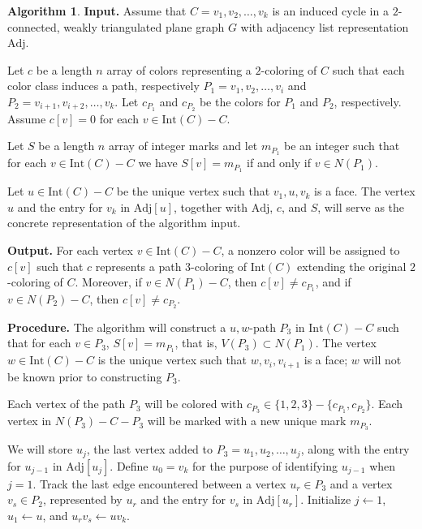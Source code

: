 \documentclass[12pt,letterpaper]{article}
\theoremstyle{plain}
\theoremstyle{definition}
\theoremstyle{break}
\newtheorem{algorithm}[lemma]{Algorithm}     %
\begin{document}
\begin{algorithm}\label{A:poh_linear}
\textbf{Input.} Assume that $C=v_1,v_2,\ldots,v_k$ is an induced cycle in a
$2$-connected, weakly triangulated plane
graph $G$ with adjacency list representation $\text{Adj}$.

Let $c$ be a length $n$ array of colors
representing a $2$-coloring of $C$ such
that each color class induces a path, respectively $P_1=v_1,v_2,\ldots,v_i$ and
$P_2=v_{i+1},v_{i+2},\ldots,v_k$. Let $c_{P_1}$ and $c_{P_2}$ be the colors
for $P_1$ and $P_2$, respectively. Assume $c[v]=0$ for each
$v\in\text{Int}(C)-C$.

Let $S$ be a length $n$ array of integer marks and let $m_{P_1}$ be an integer
such that for each $v\in\text{Int}(C)-C$ we have $S[v]=m_{P_1}$ if and only if
$v\in N(P_1)$.

Let $u\in\text{Int}(C)-C$ be the unique vertex such that $v_1,u,v_k$ is a face.
The vertex $u$ and the entry for $v_k$ in $\text{Adj}[u]$, together
with $\text{Adj}$, $c$, and $S$, will serve as the concrete
representation of the algorithm input.

\textbf{Output.} For each vertex $v\in\text{Int}(C)-C$, a nonzero color will be
assigned to $c[v]$ such that $c$ represents a path $3$-coloring of
$\text{Int}(C)$ extending the original $2$-coloring of $C$. Moreover, if
$v\in N(P_1)-C$, then $c[v]\ne c_{P_1}$, and if $v\in N(P_2)-C$, then
$c[v]\ne c_{P_2}$.

\textbf{Procedure.} The algorithm will construct a $u,w$-path $P_3$
in $\text{Int}(C)-C$ such that for each $v\in P_3$, $S[v]=m_{P_1}$, that is,
$V(P_3)\subset N(P_1)$.
The vertex $w\in\text{Int}(C)-C$ is the unique vertex such that
$w,v_i,v_{i+1}$ is a face; $w$ will
not be known prior to constructing $P_3$.

Each vertex of the path $P_3$ will be colored with
$c_{P_3}\in\{1,2,3\}-\{c_{P_1},c_{P_2}\}$.
Each vertex in $N(P_3)-C-P_3$ will be marked with a new unique
mark $m_{P_3}$.


We will store $u_j$, the last
vertex added to $P_3=u_1,u_2,\ldots,u_j$, along with the entry for
$u_{j-1}$ in $\text{Adj}[u_j]$. Define $u_0=v_k$ for the purpose
of identifying $u_{j-1}$ when $j=1$. Track the
last edge
encountered between a vertex $u_r\in P_3$ and a vertex $v_s\in P_2$, represented
by $u_r$ and the entry for $v_s$ in $\text{Adj}[u_r]$.
Initialize $j\leftarrow 1$, $u_1\leftarrow u$, and $u_rv_s\leftarrow
uv_k$. 


\end{algorithm}
\end{document}
